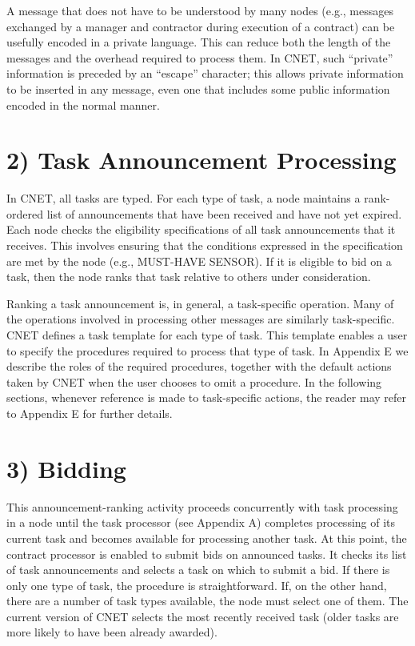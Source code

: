 \documentclass[
]{article}
\begin{document}
A message that does not have to be understood by many nodes (e.g.,
messages exchanged by a manager and contractor during execution of a
contract) can be usefully encoded in a private language. This can reduce
both the length of the messages and the overhead required to process
them. In CNET, such ``private'' information is preceded by an ``escape''
character; this allows private information to be inserted in any
message, even one that includes some public information encoded in the
normal manner.

\section{2) Task Announcement
Processing}\label{task-announcement-processing}

In CNET, all tasks are typed. For each type of task, a node maintains a
rank-ordered list of announcements that have been received and have not
yet expired. Each node checks the eligibility specifications of all task
announcements that it receives. This involves ensuring that the
conditions expressed in the specification are met by the node (e.g.,
MUST-HAVE SENSOR). If it is eligible to bid on a task, then the node
ranks that task relative to others under consideration.

Ranking a task announcement is, in general, a task-specific operation.
Many of the operations involved in processing other messages are
similarly task-specific. CNET defines a task template for each type of
task. This template enables a user to specify the procedures required to
process that type of task. In Appendix E we describe the roles of the
required procedures, together with the default actions taken by CNET
when the user chooses to omit a procedure. In the following sections,
whenever reference is made to task-specific actions, the reader may
refer to Appendix E for further details.

\section{3) Bidding}\label{bidding}

This announcement-ranking activity proceeds concurrently with task
processing in a node until the task processor (see Appendix A) completes
processing of its current task and becomes available for processing
another task. At this point, the contract processor is enabled to submit
bids on announced tasks. It checks its list of task announcements and
selects a task on which to submit a bid. If there is only one type of
task, the procedure is straightforward. If, on the other hand, there are
a number of task types available, the node must select one of them. The
current version of CNET selects the most recently received task (older
tasks are more likely to have been already awarded).
\end{document}
